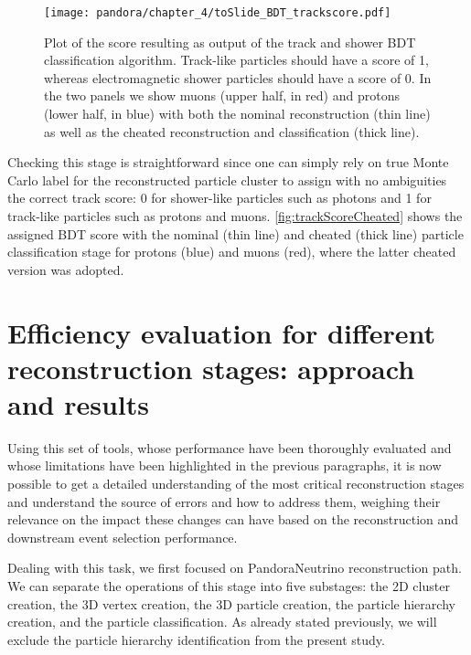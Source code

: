 \begin{figure}[!htb]
    \centering
    \texttt{[image: pandora/chapter\_4/toSlide\_BDT\_trackscore.pdf]}
    \caption[Track and shower classification BDT score]{Plot of the score resulting as output of the track and shower BDT classification algorithm. Track-like particles should have a score of 1, whereas electromagnetic shower particles should have a score of 0. In the two panels we show muons (upper half, in red) and protons (lower half, in blue) with both the nominal reconstruction (thin line) as well as the cheated reconstruction and classification (thick line). }
    \label{fig:trackScoreCheated}
\end{figure}

Checking this stage is straightforward since one can simply rely on true Monte Carlo label for the reconstructed particle cluster to assign with no ambiguities the correct track score: 0 for shower-like particles such as photons and 1 for track-like particles such as protons and muons. \autoref{fig:trackScoreCheated} shows the assigned BDT score with the nominal (thin line) and cheated (thick line) particle classification stage for protons (blue) and muons (red), where the latter cheated version was adopted. 

\section[Efficiency evaluation for different reconstruction stages]{Efficiency evaluation for different reconstruction stages: approach and results}\label{sec:methods}

Using this set of tools, whose performance have been thoroughly evaluated and whose limitations have been highlighted in the previous paragraphs, it is now possible to get a detailed understanding of the most critical reconstruction stages and understand the source of errors and how to address them, weighing their relevance on the impact these changes can have based on the reconstruction and downstream event selection performance. 

Dealing with this task, we first focused on PandoraNeutrino reconstruction path. We can separate the operations of this stage into five substages: the 2D cluster creation, the 3D vertex creation, the 3D particle creation, the particle hierarchy creation, and the particle classification. As already stated previously, we will exclude the particle hierarchy identification from the present study.


